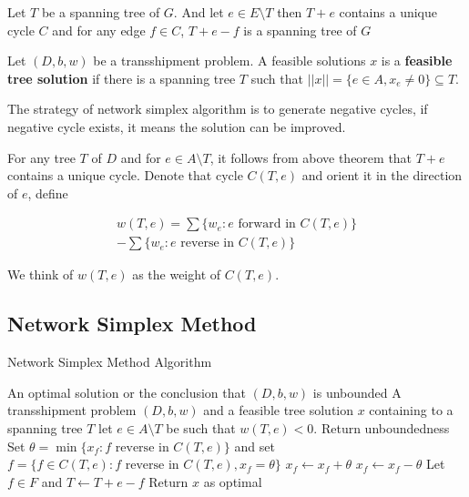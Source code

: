 			\begin{theorem}
				Let $T$ be a spanning tree of $G$. And let $e\in E\setminus T$ then $T+e$ contains a unique cycle $C$ and for any edge $f\in C$, $T+e-f$ is a spanning tree of $G$
			\end{theorem}

			Let $(D, b, w)$ be a transshipment problem. A feasible solutions $x$ is a \textbf{feasible tree solution} if there is a spanning tree $T$ such that $||x|| = \{e\in A, x_e\neq 0\} \subseteq T$.

			The strategy of network simplex algorithm is to generate negative cycles, if negative cycle exists, it means the solution can be improved.

			For any tree $T$ of $D$ and for $e\in A\setminus T$, it follows from above theorem that $T+e$ contains a unique cycle. Denote that cycle $C(T, e)$ and orient it in the direction of $e$, define 

			\begin{eqnarray}
				w(T, e) = \sum\{w_e: e \text{ forward in } C(T, e)\} \nonumber \\ 
						- \sum\{w_e: e \text{ reverse in } C(T, e)\}
			\end{eqnarray}

			We think of $w(T, e)$ as the weight of $C(T,e)$.

			\subsection{Network Simplex Method}
				\begin{algorithm}
					\caption{Network Simplex Method Algorithm}
					\begin{algorithmic}
						\ENSURE An optimal solution or the conclusion that $(D, b, w)$ is unbounded
						\REQUIRE A transshipment problem $(D, b, w)$ and a feasible tree solution $x$ containing to a spanning tree $T$
							\STATE let $e \in A \setminus T$ be such that $w(T, e) < 0$.
								\STATE Return unboundedness
							\ELSE
								\STATE Set $\theta = \min\{x_f: f \text{ reverse in } C(T, e)\}$ and set $f = \{f\in C(T, e): f \text{ reverse in } C(T, e), x_f = \theta\}$
									\STATE $x_f \gets x_f + \theta$
								\ELSE
									\STATE $x_f \gets x_f - \theta$
								\ENDIF
								\STATE Let $f \in F$ and $T \gets T+e-f$
							\ENDIF
						\ENDWHILE
						\STATE Return $x$ as optimal					
					\end{algorithmic}
				\end{algorithm}

